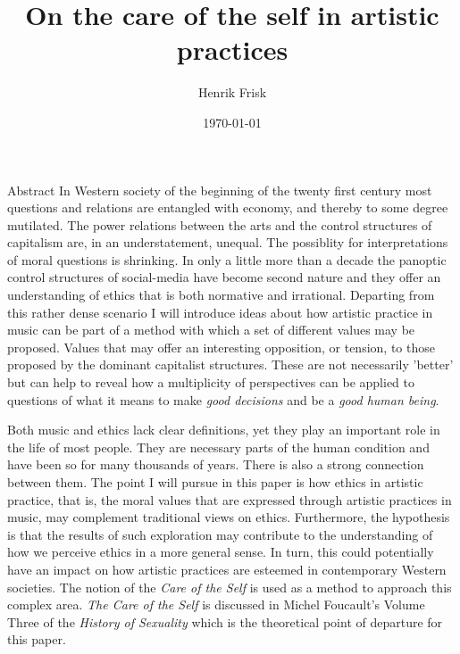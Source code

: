 \documentclass[presentation]{beamer}
\author{Henrik Frisk}
\date{\today}
\title{On the care of the self in artistic practices}
\begin{document}
\maketitle
\renewcommand\familydefault{\sfdefault}
\begin{frame}[label={sec:org4352872}]{Abstract}
In Western society of the beginning of the twenty first century most questions and relations are entangled with economy, and thereby to some degree mutilated. The power relations between the arts and the control structures of capitalism are, in an understatement, unequal. The possiblity for interpretations of moral questions is shrinking. In only a little more than a decade the panoptic control structures of social-media have become second nature and they offer an understanding of ethics that is both normative and irrational. Departing from this rather dense scenario I will introduce ideas about how artistic practice in music can be part of a method with which a set of different values may be proposed. Values that may offer an interesting opposition, or tension, to those proposed by the dominant capitalist structures. These are not necessarily 'better' but can help to reveal how a multiplicity of perspectives can be applied to questions of what it means to make \emph{good decisions} and be a \emph{good human being}.

Both music and ethics lack clear definitions, yet they play an important role in the life of most people. They are necessary parts of the human condition and have been so for many thousands of years. There is also a strong connection between them. The point I will pursue in this paper is how ethics in artistic practice, that is, the moral values that are expressed through artistic practices in music, may complement traditional views on ethics. Furthermore, the hypothesis is that the results of such exploration may contribute to the understanding of how we perceive ethics in a more general sense. In turn, this could potentially have an impact on how artistic practices are esteemed in contemporary Western societies. The notion of the \emph{Care of the Self} is used as a method to approach this complex area. \emph{The Care of the Self} is discussed in Michel Foucault's Volume Three of the \emph{History of Sexuality} which is the theoretical point of departure for this paper.


\end{frame}
\end{document}

